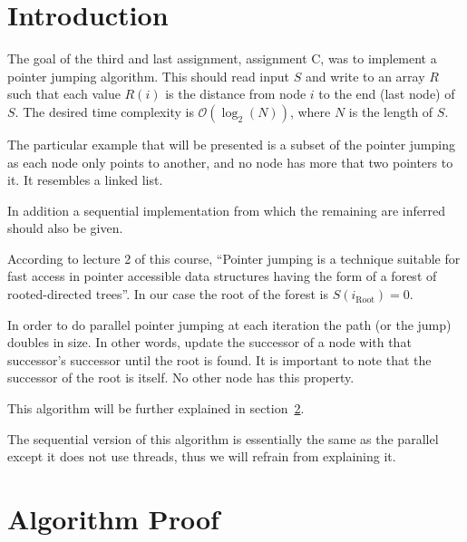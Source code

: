 \renewcommand{\O}{\mathcal{O}}


\section{Introduction}

The goal of the third and last assignment, assignment C, was to implement a pointer jumping algorithm. This should read input $S$ and write to an 
array $R$ such that each value $R(i)$ is the distance from node $i$ to the end (last node) of
$S$. The desired time complexity is $\O(\log_2(N))$, where $N$ is the length of $S$.

The particular example that will be presented is a subset of the pointer jumping as each
node only points to another, and no node has more that two pointers to it. It resembles a linked list.

In addition a sequential implementation from which the remaining are inferred should also be given. 

According to lecture 2 of this course, ``Pointer jumping is a technique suitable for fast access in pointer accessible data structures having the form of a forest of rooted-directed trees''. In our case the root of the forest is $S(i_\text{Root}) = 0$.

In order to do parallel pointer jumping at each iteration the path (or the jump) doubles in size. In other words, update the successor of a node with that successor's successor until the root is found. It is important to note that the successor of the root is itself. No other node has this property.

This algorithm will be further explained in section~\ref{sec:proof}.

The sequential version of this algorithm is essentially the same as the parallel except it does not use threads, thus we will refrain from explaining it.

\section{Algorithm Proof}
\label{sec:proof}


